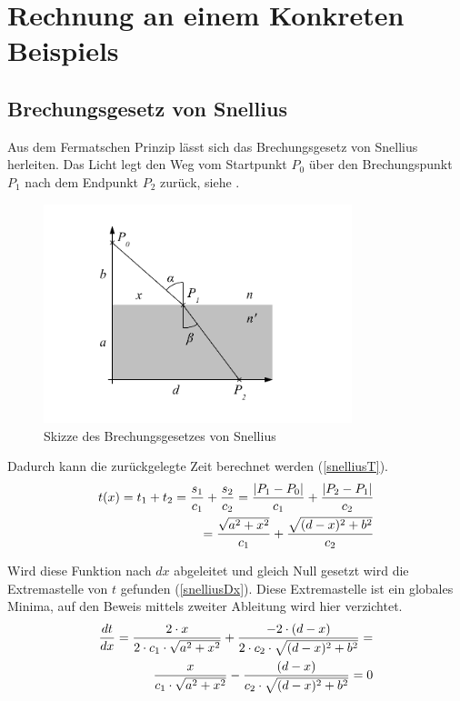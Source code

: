 \section{Rechnung an einem Konkreten Beispiels}

\subsection{Brechungsgesetz von Snellius \label{brechungsgesetz}}
\cite{Wikipedia} Aus dem Fermatschen Prinzip lässt sich das Brechungsgesetz von Snellius herleiten.
Das Licht legt den Weg vom Startpunkt $P_0$ über den Brechungspunkt $P_1$ 
nach dem Endpunkt $P_2$ zurück, siehe .
\begin{figure}[H]
	\includegraphics[width=0.8\textwidth]{./picture/Brechung.pdf}
	\caption{Skizze des Brechungsgesetzes von Snellius}
	\label{Ab:brechung}
\end{figure}

Dadurch kann die zurückgelegte Zeit berechnet werden (\eqref{snelliusT}).
\begin{align}
t(x) = t_1 + t_2 = \frac{s_1}{c_1} + \frac{s_2}{c_2} = \frac{|P_1 - P_0|}{c_1} + \frac{|P_2 - P_1|}{c_2} \notag \\
= \frac{\sqrt{a^2 + x^2}}{c_1} + \frac{\sqrt{(d-x)^2 + b^2}}{c_2} \label{snelliusT}
\end{align}

Wird diese Funktion nach $dx$ abgeleitet und gleich Null gesetzt wird die Extremastelle von $t$ gefunden (\eqref{snelliusDx}). Diese Extremastelle ist ein globales Minima, auf den Beweis mittels zweiter Ableitung wird hier verzichtet.
\begin{align}
	\frac{dt}{dx} = \frac{2 \cdot x}{2 \cdot c_1 \cdot \sqrt{a^2 + x^2}} + \frac{-2 \cdot (d-x)}{2 \cdot c_2 \cdot \sqrt{(d-x)^2 + b^2}} = \notag \\
	\frac{x}{c_1 \cdot \sqrt{a^2 + x^2}} - \frac{(d-x)}{c_2 \cdot \sqrt{(d-x)^2 + b^2}} = 0 \label{snelliusDx}\\
\end{align}

